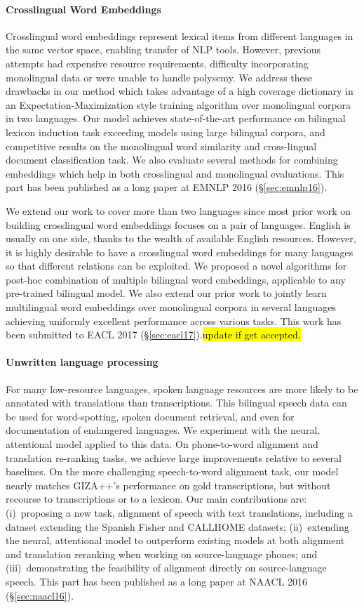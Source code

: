 \documentclass[12pt,twoside,final,hidelinks]{ltthesis}
\theoremstyle{definition}
\newcommand\naaclvi{NAACL 2016 (\S\ref{sec:naacl16})}
\newcommand\emnlpvi{EMNLP 2016 (\S\ref{sec:emnlp16})}
\newcommand\eaclvii{EACL 2017 (\S\ref{sec:eacl17})}
\newcommand{\tofix}[1]{\hl{#1}}
\begin{document}
\paragraph{Crosslingual Word Embeddings}
Crosslingual word embeddings represent lexical items from different languages in the same vector space, enabling transfer of NLP tools. 
However, previous attempts had %
expensive resource requirements, difficulty incorporating monolingual data or were unable to handle polysemy.
We address these drawbacks in our method which takes advantage of a high coverage dictionary in an Expectation-Maximization style training algorithm over monolingual corpora in two languages. Our model achieves state-of-the-art performance on bilingual lexicon induction task exceeding models using large bilingual corpora, and
competitive results on the monolingual word similarity and cross-lingual document classification task. We also evaluate several methods for combining embeddings which help in both crosslingual and monolingual evaluations. This part has been published as a long paper at \emnlpvi. 

We extend our work to cover more than two languages since most prior work on building crosslingual word embeddings focuses on a pair of languages.
English is usually on one side, thanks to the wealth of available English resources.
However, it is highly desirable to have a crosslingual word embeddings for many languages so that different relations can be exploited. We proposed a novel algorithms for post-hoc combination of multiple bilingual word embeddings, applicable to any pre-trained bilingual model. We also extend our prior work to jointly learn multilingual word embeddings over monolingual corpora in several languages achieving uniformly excellent performance across various tasks. This work has been submitted to \eaclvii.\tofix{update if get accepted.}

\paragraph{Unwritten language processing} For many low-resource languages, spoken language resources are more likely to be annotated with translations than transcriptions.
This bilingual speech data can be used for word-spotting, spoken document retrieval, and even for documentation of endangered languages.
We experiment with the neural, attentional model applied to this data.
On phone-to-word alignment and translation re-ranking tasks, we achieve large improvements relative to several baselines.
On the more challenging speech-to-word alignment task, our model nearly matches GIZA++'s performance on gold transcriptions, but without recourse to transcriptions or to a lexicon.
Our main contributions are:
(i)~proposing a new task, alignment of speech with text translations, including a dataset extending the Spanish Fisher and CALLHOME datasets;
(ii)~extending the neural, attentional model to outperform existing models at both alignment and translation reranking when working on source-language phones; and
(iii)~demonstrating the feasibility of alignment directly on source-language speech. This part has been published as a long paper at \naaclvi. 
\end{document}
